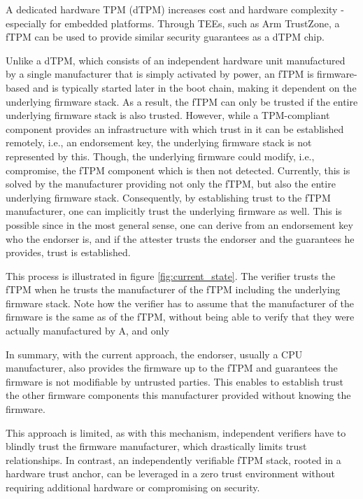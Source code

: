 A dedicated hardware \ac{TPM} (dTPM) increases cost and hardware complexity - especially for embedded platforms.
Through \acp{TEE}, such as Arm TrustZone, a \ac{fTPM} can be used to provide similar security guarantees as a dTPM chip.


Unlike a dTPM, which consists of an independent hardware unit manufactured by a single manufacturer that is simply activated by power, an \ac{fTPM} is firmware-based and is typically started later in the boot chain, making it dependent on the underlying firmware stack.
As a result, the fTPM can only be trusted if the entire underlying firmware stack is also trusted.
However, while a TPM-compliant component provides an infrastructure with which trust in it can be established remotely, i.e., an endorsement key, the underlying firmware stack is not represented by this.
Though, the underlying firmware could modify, i.e., compromise, the fTPM component which is then not detected.
Currently, this is solved by the manufacturer providing not only the fTPM, but also the entire underlying firmware stack.
Consequently, by establishing trust to the fTPM manufacturer, one can implicitly trust the underlying firmware as well.
This is possible since in the most general sense, one can derive from an endorsement key who the endorser is, and if the attester trusts the endorser and the guarantees he provides, trust is established.

This process is illustrated in figure \autoref{fig:current_state}. The verifier trusts the \ac{fTPM} when he trusts the manufacturer of the fTPM including the underlying firmware stack. Note how the verifier has to assume that the manufacturer of the firmware is the same as of the fTPM, without being able to verify that they were actually manufactured by A, and only 



In summary, with the current approach, the endorser, usually a CPU manufacturer, also provides the firmware up to the fTPM and guarantees the firmware is not modifiable by untrusted parties. This enables to establish trust the other firmware components this manufacturer provided without knowing the firmware.


This approach is limited, as with this mechanism, independent verifiers have to blindly trust the firmware manufacturer, which drastically limits trust relationships.
In contrast, an independently verifiable fTPM stack, rooted in a hardware trust anchor, can be leveraged in a zero trust environment without requiring additional hardware or compromising on security.

